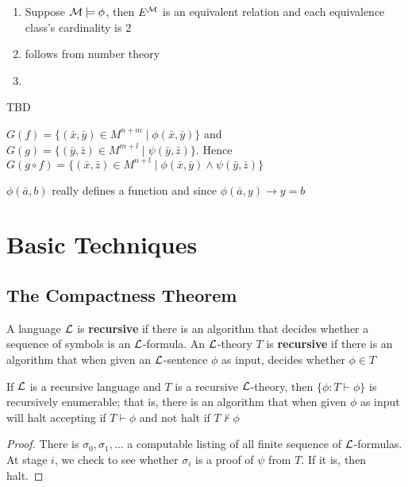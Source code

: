 \documentclass[11pt]{article}
\begin{document}
\begin{exercise}
\begin{enumerate}
\item Suppose \(\mathcal{M}\models\phi\), then \(E^{\mathcal{M}}\) is an equivalent relation and
each equivalence class's cardinality is 2
\item follows from number theory
\item \cite{DBLP:journals/bsl/DurandJMM12}
\end{enumerate}
\end{exercise}

\begin{exercise}
TBD
\end{exercise}

\begin{exercise}
\(G(f)=\{(\bar{x},\bar{y})\in M^{n+m}\mid\phi(\bar{x},\bar{y})\}\) and 
\(G(g)=\{(\bar{y},\bar{z})\in M^{m+l}\mid\psi(\bar{y},\bar{z})\}\). Hence
\(G(g\circ f)=\{(\bar{x},\bar{z})\in M^{n+l}\mid \phi(\bar{x},\bar{y})
   \wedge \psi(\bar{y},\bar{z})\}\)
\end{exercise}

\begin{exercise}
\(\phi(\bar{a},b)\) really defines a function and since 
\(\phi(\bar{a},y)\to y=b\)
\end{exercise}

\section{Basic Techniques}
\label{sec:org73d27f9}
\subsection{The Compactness Theorem}
\label{sec:orgeef2e86}
A language \(\mathcal{L}\) is \textbf{recursive} if there is an algorithm that decides
whether a sequence of symbols is an \(\mathcal{L}\)-formula. An \(\mathcal{L}\)-theory
\(T\) is \textbf{recursive} if there is an algorithm that when given an
\(\mathcal{L}\)-sentence \(\phi\) as input, decides whether \(\phi\in T\)

\begin{proposition}[]
If \(\mathcal{L}\) is a recursive language and \(T\) is a recursive \(\mathcal{L}\)-theory,
then \(\{\phi:T\vdash\phi\}\) is recursively enumerable; that is, there is an
algorithm that when given \(\phi\) as input will halt accepting if \(T\vdash\phi\)
and not halt if \(T\not\vdash\phi\)
\end{proposition}
\begin{proof}
There is \(\sigma_0,\sigma_1,\dots\) a computable listing of all finite
sequence of \(\mathcal{L}\)-formulas. At stage \(i\), we check to see whether
\(\sigma_i\) is a proof of \(\psi\) from \(T\). If it is, then halt.
\end{proof}
\end{document}
